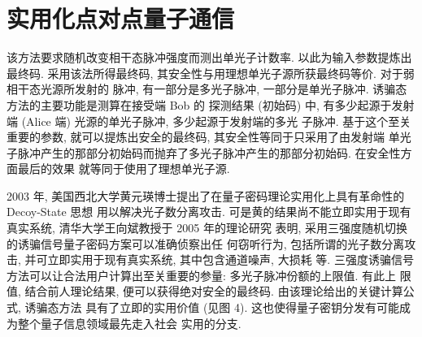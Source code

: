 \section{实用化点对点量子通信}
该方法要求随机改变相干态脉冲强度而测出单光子计数率. 以此为输入参数提炼出最终码. 采用该法所得最终码, 其安全性与用理想单光子源所获最终码等价. 对于弱相干态光源所发射的 脉冲, 有一部分是多光子脉冲, 一部分是单光子脉冲. 诱骗态方法的主要功能是测算在接受端 Bob 的 探测结果 (初始码) 中, 有多少起源于发射端 (Alice 端) 光源的单光子脉冲, 多少起源于发射端的多光 子脉冲. 基于这个至关重要的参数, 就可以提炼出安全的最终码, 其安全性等同于只采用了由发射端 单光子脉冲产生的那部分初始码而抛弃了多光子脉冲产生的那部分初始码. 在安全性方面最后的效果 就等同于使用了理想单光子源.

2003 年, 美国西北大学黄元瑛博士提出了在量子密码理论实用化上具有革命性的 Decoy-State 思想 \cite{Hwang2003} 用以解决光子数分离攻击. 可是黄的结果尚不能立即实用于现有真实系统, 清华大学王向斌教授于 2005 年的理论研究 \cite{Wang2005} 表明, 采用三强度随机切换的诱骗信号量子密码方案可以准确侦察出任 何窃听行为, 包括所谓的光子数分离攻击, 并可立即实用于现有真实系统, 其中包含通道噪声, 大损耗 等. 三强度诱骗信号方法可以让合法用户计算出至关重要的参量: 多光子脉冲份额的上限值. 有此上 限值, 结合前人理论结果, 便可以获得绝对安全的最终码. 由该理论给出的关键计算公式, 诱骗态方法 具有了立即的实用价值 (见图 4). 这也使得量子密钥分发有可能成为整个量子信息领域最先走入社会 实用的分支.

